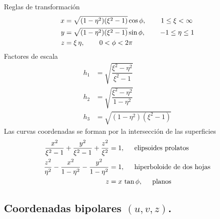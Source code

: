 \documentclass[hidelinks,12pt]{article}
\begin{document}
Reglas de transformación
\begin{align*}
    x &= \sqrt{(1 - \eta^{2})(\xi^{2} - 1)} \cos \phi, \hspace{0.75cm} 1 \leq \xi < \infty \\
    y &= \sqrt{(1 - \eta^{2})(\xi^{2} - 1)} \sin \phi, \hspace{0.75cm} -1 \leq \eta \leq 1 \\
    z &= \xi \, \eta, \hspace{0.75cm} 0 < \phi < 2 \pi
\end{align*}
Factores de escala
\begin{align*}
    h_{1} &= \sqrt{\dfrac{\xi^{2} - \eta^{2}}{\xi^{2} - 1}} \\
    h_{2} &= \sqrt{\dfrac{\xi^{2} - \eta^{2}}{1 - \eta^{2}}} \\
    h_{3} &= \sqrt{(1 - \eta^{2})(\xi^{2} - 1)}
\end{align*}
Las curvas coordenadas se forman por la intersección de las superficies
\begin{align*}
    \dfrac{x^{2}}{\xi^{2} - 1} + \dfrac{y^{2}}{\xi^{2} - 1} + \dfrac{z^{2}}{\xi^{2}} &= 1, \hspace{0.5cm} \text{elipsoides prolatos} \\
    \dfrac{z^{2}}{\eta^{2}} - \dfrac{x^{2}}{1 - \eta^{2}} - \dfrac{y^{2}}{1 - \eta^{2}} &= 1, \hspace{0.5cm} \text{hiperboloide de dos hojas} \\
    z &= x \, \tan \phi, \hspace{0.5cm} \text{planos}
\end{align*}

\subsection{Coordenadas bipolares \texorpdfstring{$(u, v, z)$}{(u, v, z)}.}
\end{document}
